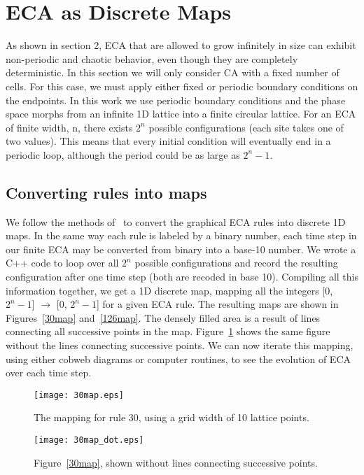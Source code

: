 \section{ECA as Discrete Maps}

As shown in section 2, ECA that are allowed to grow infinitely in size can exhibit non-periodic and chaotic behavior, even though they are completely deterministic.   
In this section we will only consider CA with a fixed number of cells.  
For this case, we must apply either fixed or periodic boundary conditions on the endpoints.  
In this work we use periodic boundary conditions and the phase space morphs from an infinite 1D lattice into a finite circular lattice.  
For an ECA of finite width, n, there exists $2^n$ possible configurations (each site takes one of two values).  
This means that every initial condition will eventually end in a periodic loop, although the period could be as large as $2^n -1$.  

\subsection{Converting rules into maps}

We follow the methods of~\cite{sed} to convert the graphical ECA rules into discrete 1D maps.  
In the same way each rule is labeled by a binary number, each time step in our finite ECA may be converted from binary into a base-10 number.  
We wrote a \textsc{C++} code to loop over all $2^n$ possible configurations and record the resulting configuration after one time step (both are recoded in base 10).  
Compiling all this information together, we get a 1D discrete map, mapping all the integers [0, $2^n -1$] $\rightarrow$ [0, $2^n -1$] for a given ECA rule.  
The resulting maps are shown in Figures~\ref{30map} and~\ref{126map}.  
The densely filled area is a result of lines connecting all successive points in the map.  
Figure~\ref{30map_dot} shows the same figure without the  lines connecting successive points.  
We can now iterate this mapping, using either cobweb diagrams or computer routines, to see the evolution of ECA over each time step.  

\begin{figure}
    \begin{minipage}[b]{0.49\textwidth}
        \centering
        \texttt{[image: 30map.eps]}
        \caption{\label{30map} The mapping for rule 30, using a grid width of 10 lattice points.  }
    \end{minipage}
    \hspace{0.5cm}
    \begin{minipage}[b]{0.49\textwidth}
        \centering
        \texttt{[image: 30map\_dot.eps]}
        \caption{\label{30map_dot} Figure~\ref{30map}, shown without lines connecting successive points.}
    \end{minipage}
\end{figure}

